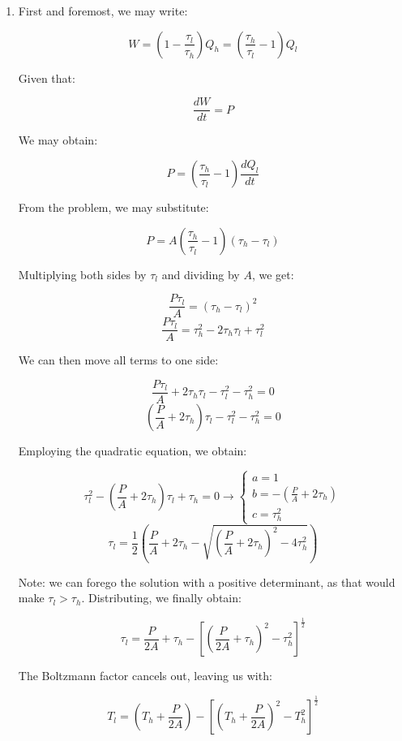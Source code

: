 \begin{enumerate}
    \begin{enumerate}

      \item 

        First and foremost, we may write:

        $$W=\left( 1-\frac{\tau_l}{\tau_h} \right)Q_h=\left( \frac{\tau_h}{\tau_l}-1 \right)Q_l$$

        Given that:

        $$\frac{dW}{dt}=P$$

        We may obtain:

        $$P=\left( \frac{\tau_h}{\tau_l}-1 \right)\frac{dQ_l}{dt}$$

        From the problem, we may substitute:

        $$P=A\left( \frac{\tau_h}{\tau_l}-1 \right)(\tau_h-\tau_l)$$

        Multiplying both sides by $\tau_l$ and dividing by $A$, we get:

        $$\frac{P\tau_l}{A}=(\tau_h-\tau_l)^2$$
        $$\frac{P\tau_l}{A}=\tau_h^2-2\tau_h\tau_l+\tau_l^2$$

        We can then move all terms to one side:

        $$\frac{P\tau_l}{A}+2\tau_h\tau_l-\tau_l^2-\tau_h^2=0$$
        $$\left(\frac{P}{A}+2\tau_h\right)\tau_l-\tau_l^2-\tau_h^2=0$$

        Employing the quadratic equation, we obtain:

        $$\tau_l^2-\left( \frac{P}{A}+2\tau_h \right)\tau_l+\tau_h=0\to \left\{\begin{array}{l} a=1\\b=-\left( \frac{P}{A}+2\tau_h \right)\\c=\tau_h^2\end{array}$$
        $$\tau_l=\frac{1}{2}\left( \frac{P}{A}+2\tau_h-\sqrt{\left( \frac{P}{A}+2\tau_h \right)^2-4\tau_h^2}\right)$$

        Note: we can forego the solution with a positive determinant, as that would make $\tau_l>\tau_h$. Distributing, we finally obtain:

        $$\tau_l=\frac{P}{2A}+\tau_h-\left[ \left( \frac{P}{2A}+\tau_h \right)^2-\tau_h^2 \right]^{\frac{1}{2}}$$

        The Boltzmann factor cancels out, leaving us with:

        $$\boxed{T_l=\left(T_h+\frac{P}{2A}\right)-\left[ \left( T_h+\frac{P}{2A} \right)^2-T_h^2 \right]^{\frac{1}{2}}}$$


\end{enumerate}
\end{enumerate}
